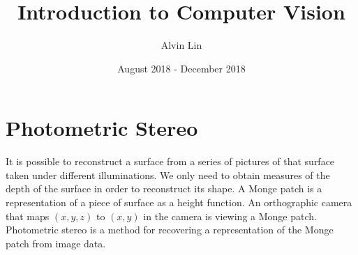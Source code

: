 \documentclass{math}
\title{Introduction to Computer Vision}
\author{Alvin Lin}
\date{August 2018 - December 2018}
\begin{document}
\maketitle

\section*{Photometric Stereo}
It is possible to reconstruct a surface from a series of pictures of that
surface taken under different illuminations. We only need to obtain measures
of the depth of the surface in order to reconstruct its shape. A Monge
patch is a representation of a piece of surface as a height function. An
orthographic camera that maps \( (x,y,z) \) to \( (x,y) \) in the camera is
viewing a Monge patch. Photometric stereo is a method for recovering a
representation of the Monge patch from image data.
\end{document}
